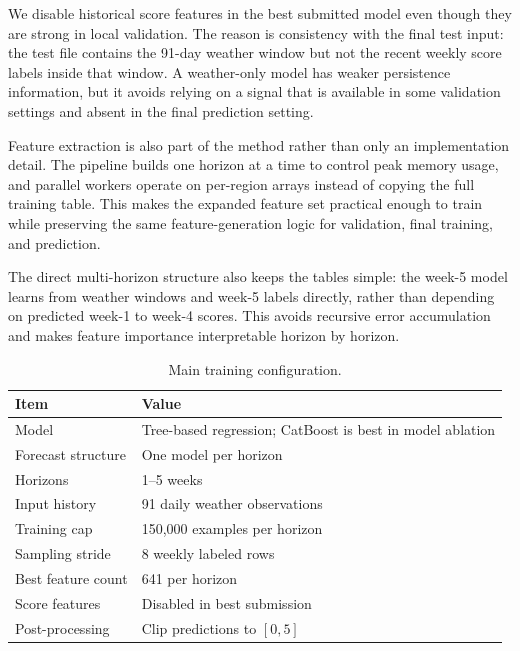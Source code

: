 \documentclass[conference]{IEEEtran}
\begin{document}
We disable historical score features in the best submitted model even though
they are strong in local validation. The reason is consistency with the final
test input: the test file contains the 91-day weather window but not the recent
weekly score labels inside that window. A weather-only model has weaker
persistence information, but it avoids relying on a signal that is available in
some validation settings and absent in the final prediction setting.

Feature extraction is also part of the method rather than only an implementation
detail. The pipeline builds one horizon at a time to control peak memory usage,
and parallel workers operate on per-region arrays instead of copying the full
training table. This makes the expanded feature set practical enough to train
while preserving the same feature-generation logic for validation, final
training, and prediction.

The direct multi-horizon structure also keeps the tables simple: the week-5
model learns from weather windows and week-5 labels directly, rather than
depending on predicted week-1 to week-4 scores. This avoids recursive error
accumulation and makes feature importance interpretable horizon by horizon.

\begin{table}[t]
\centering
\caption{Main training configuration.}
\label{tab:training_config}
\begin{tabular}{p{}p{}}
\toprule
\renewcommand{\arraystretch}{1.3}
Item & Value \\
\midrule
Model & Tree-based regression; CatBoost is best in model ablation \\
\addlinespace
Forecast structure & One model per horizon \\
\addlinespace
Horizons & 1--5 weeks \\
\addlinespace
Input history & 91 daily weather observations \\
\addlinespace
Training cap & 150,000 examples per horizon \\
\addlinespace
Sampling stride & 8 weekly labeled rows \\
\addlinespace
Best feature count & 641 per horizon \\
\addlinespace
Score features & Disabled in best submission \\
\addlinespace
Post-processing & Clip predictions to $[0,5]$ \\
\bottomrule
\end{tabular}
\end{table}
\end{document}
